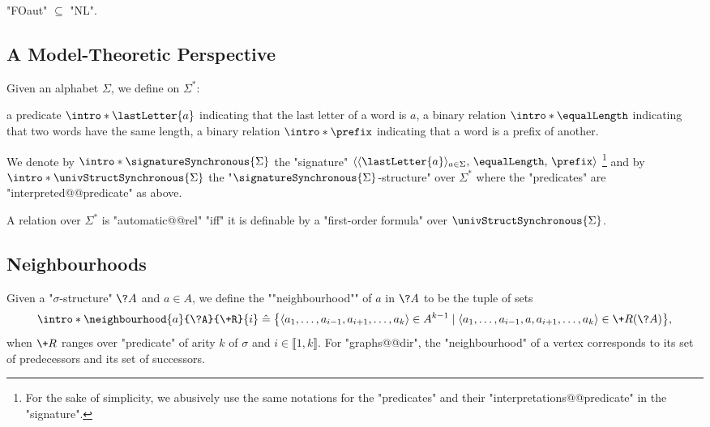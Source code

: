 \begin{proposition}
	"FOaut" $\subseteq$ "NL".
\end{proposition}


\subsection{A Model-Theoretic Perspective}

Given an alphabet $\Sigma$, we define on $\Sigma^*$:
\begin{itemize}
	\itemAP a predicate $\intro*\lastLetter{a}$ indicating that the last letter of a word is $a$,
	\itemAP a binary relation $\intro*\equalLength$ indicating that two words have the same length,
	\itemAP a binary relation $\intro*\prefix$ indicating that a word is a prefix of another.
\end{itemize} 
We denote by $\intro*\signatureSynchronous{\Sigma}$ the "signature" $\langle \langle\lastLetter{a}\rangle_{a \in \Sigma},\, \equalLength,\, \prefix \rangle$%
\footnote{For the sake of simplicity, we abusively use the same notations for
the "predicates" and their "interpretations@@predicate" in the "signature".} and
by \AP$\intro*\univStructSynchronous{\Sigma}$ the "$\signatureSynchronous{\Sigma}$-structure" over $\Sigma^*$ where
the "predicates" are "interpreted@@predicate" as above.

\begin{proposition}
	\label{prop:automatic-first-order}
	A relation over $\Sigma^*$ is "automatic@@rel" "iff" it is definable by a "first-order formula" over \(\univStructSynchronous{\Sigma}\).
\end{proposition}

\subsection{Neighbourhoods}

Given a "$\sigma$-structure" $\?A$ and $a \in A$, we define the \AP""neighbourhood"" of $a$
in $\?A$
to be the tuple of sets
\[
	\intro*\neighbourhood{a}{\?A}{\+R}{i} \defeq
		\big\{
			\langle a_1, \hdots, a_{i-1}, a_{i+1}, \hdots, a_k \rangle \in A^{k-1} \mid
			\langle a_1, \hdots, a_{i-1}, a, a_{i+1}, \hdots, a_k \rangle \in \+R(\?A)
		\big\},
\]
when $\+R$ ranges over "predicate" of arity $k$ of $\sigma$ and $i \in \lBrack 1,k\rBrack$. 
For "graphs@@dir", the "neighbourhood" of a vertex corresponds to its set of predecessors and
its set of successors.

